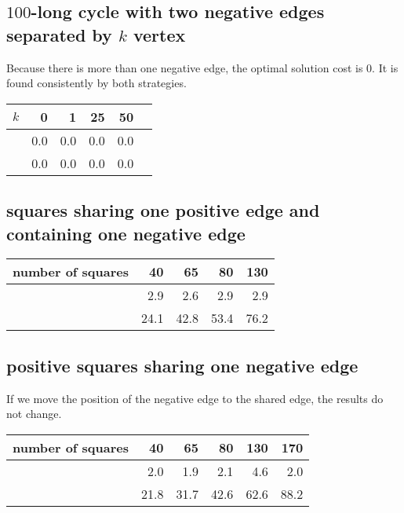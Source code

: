 \subsection{$100$-long cycle with two negative edges separated by $k$ vertex}
Because there is more than one negative edge, the optimal solution cost is 0.
It is found consistently by both strategies.

\begin{center}
\begin{tabular}{lrrrrr}
\toprule
$k$ &   0  &   1  &   25 &   50  \\
\midrule
\pot{} & 0.0 & 0.0 & 0.0 & 0.0  \\
\pat{} &  0.0 &  0.0 & 0.0 & 0.0  \\
\bottomrule
\end{tabular}
\end{center}

\subsection{squares sharing one positive edge and containing one negative edge}

\begin{center}
\begin{tabular}{lrrrr}
\toprule
number of squares &  40  &  65  &  80  &  130 \\
\midrule
\pot{} &  2.9 &  2.6 &  2.9 &  2.9 \\
\pat{} & 24.1 & 42.8 & 53.4 & 76.2 \\
\bottomrule
\end{tabular}
\end{center}

\subsection{positive squares sharing one negative edge}

If we move the position of the negative edge to the shared edge, the results
do not change.

\begin{center}
\begin{tabular}{lrrrrr}
\toprule
number of squares &  40  &  65  &  80  &  130 &  170 \\
\midrule
\pot{} &  2.0 &  1.9 &  2.1 &  4.6 &  2.0 \\
\pat{} & 21.8 & 31.7 & 42.6 & 62.6 & 88.2 \\
\bottomrule
\end{tabular}
\end{center}

